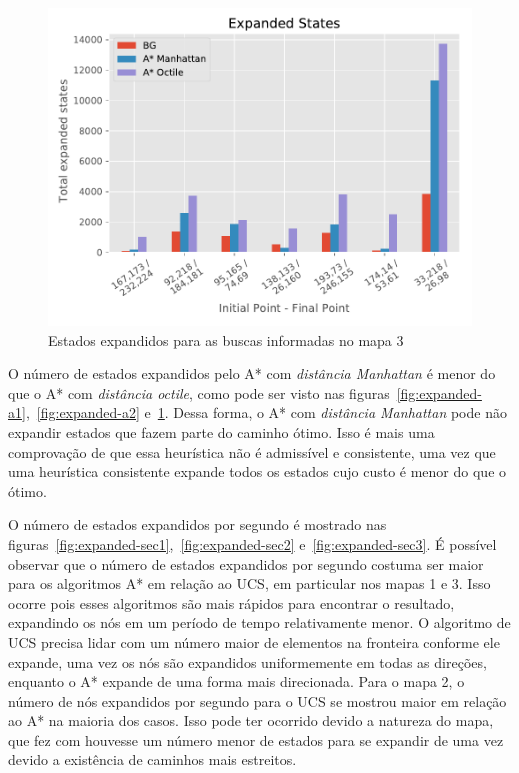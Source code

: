 \begin{figure}[!htb]
\begin{minipage}{0.5\linewidth}
\centering
\includegraphics[width=\textwidth]{Images/Expanded_States_map3_log_heuristic.pdf}
\caption{Estados expandidos para as buscas informadas no mapa 3}
\label{fig:expanded-a3}
\end{minipage}
\end{figure}

O número de estados expandidos pelo A* com \textit{distância Manhattan} é menor do que o A* com \textit{distância octile}, como pode ser visto nas figuras~\ref{fig:expanded-a1},~\ref{fig:expanded-a2} e~\ref{fig:expanded-a3}. Dessa forma, o A* com \textit{distância Manhattan} pode não expandir estados que fazem parte do caminho ótimo. Isso é mais uma comprovação de que essa heurística não é admissível e consistente, uma vez que uma heurística consistente expande todos os estados cujo custo é menor do que o ótimo.

O número de estados expandidos por segundo é mostrado nas figuras~\ref{fig:expanded-sec1},~\ref{fig:expanded-sec2} e~\ref{fig:expanded-sec3}. É possível observar que o número de estados expandidos por segundo costuma ser maior para os algoritmos A* em relação ao UCS, em particular nos mapas 1 e 3. Isso ocorre pois esses algoritmos são mais rápidos para encontrar o resultado, expandindo os nós em um período de tempo relativamente menor. O algoritmo de UCS precisa lidar com um número maior de elementos na fronteira conforme ele expande, uma vez os nós são expandidos uniformemente em todas as direções, enquanto o A* expande de uma forma mais direcionada. Para o mapa 2, o número de nós expandidos por segundo para o UCS se mostrou maior em relação ao A* na maioria dos casos. Isso pode ter ocorrido devido a natureza do mapa, que fez com houvesse um número menor de estados para se expandir de uma vez devido a existência de caminhos mais estreitos.

